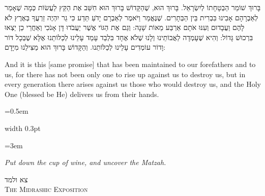 \documentclass[11pt, openany]{book}
\newcommand{\instruction}[1]{%
  \par\vspace{3pt}
  \begin{tcolorbox}[
    enhanced,
    breakable,
    colback=sederlight,
    colframe=sederlight,
    boxrule=0pt,
    left=10pt,
    right=6pt,
    top=4pt,
    bottom=4pt,
    borderline west={2pt}{0pt}{sederwine!60},
    arc=0pt,
    outer arc=0pt,
  ]
    {\small\itshape\textcolor{sederwine}{#1}}
  \end{tcolorbox}
  \par\vspace{2pt}
}
\newlength{\bidiHebWidth}
\newlength{\bidiEngWidth}
\newenvironment{bilingual}{%
  \par\vspace{4pt}%
}{%
  \noindent
  \begin{minipage}[t]{\bidiEngWidth}
    \setstretch{1.4}\emergencystretch=0.5em\normalsize
    \usebox{\bidiEngBox}
  \end{minipage}%
  \hfill
  {\color{sedergold}\vrule width 0.3pt}%
  \hfill
  \begin{minipage}[t]{\bidiHebWidth}
    \begingroup\hebrewfont\TeXXeTstate=1\beginR
    \large\setstretch{1.4}\emergencystretch=3em\tolerance=9999\parindent=0pt\relax
    \usebox{\bidiHebBox}
    \endR\endgroup
  \end{minipage}%
  \par\vspace{2pt}%
}
\newenvironment{hebrewcol}{%
  \begin{lrbox}{\bidiHebBox}\begin{minipage}{\bidiHebWidth}%
}{%
  \end{minipage}\end{lrbox}%
}
\newenvironment{englishcol}{%
  \begin{lrbox}{\bidiEngBox}\begin{minipage}{\bidiEngWidth}%
}{%
  \end{minipage}\end{lrbox}%
}
\newcommand{\subsedertitle}[2]{%
  \par\vspace{8pt}
  \begin{center}
    {\hebrewfontlarge\TeXXeTstate=1\beginR\textcolor{sederblue}{#1}\endR}\\[3pt]
    {\normalsize\scshape\textcolor{sederblue}{#2}}
  \end{center}
  \par\vspace{3pt}
}
\begin{document}
\begin{bilingual}
\begin{hebrewcol}
בָּרוּךְ שׁוֹמֵר הַבְטָחָתוֹ לְיִשְׂרָאֵל. בָּרוּךְ הוּא, שֶׁהַקָּדוֹשׁ בָּרוּךְ הוּא חִשֵּׁב אֶת הַקֵּץ לַעֲשׂוֹת כְּמָה שֶׁאָמַר לְאַבְרָהָם אָבִינוּ בִּבְרִית בֵּין הַבְּתָרִים. שֶׁנֶּאֱמַר וַיֹּאמֶר לְאַבְרָם יָדֹעַ תֵּדַע כִּי גֵר יִהְיֶה זַרְעֲךָ בְּאֶרֶץ לֹא לָהֶם וַעֲבָדוּם וְעִנּוּ אֹתָם אַרְבַּע מֵאוֹת שָׁנָה: וְגַם אֶת הַגּוֹי אֲשֶׁר יַעֲבֹדוּ דָּן אָנֹכִי וְאַחֲרֵי כֵן יֵצְאוּ בִּרְכוּשׁ גָּדוֹל:
וְהִיא שֶׁעָמְדָה לַאֲבוֹתֵינוּ וְלָנוּ שֶׁלֹא אֶחָד בִּלְבַד עָמַד עָלֵינוּ לְכַלּוֹתֵנוּ אֶלָּא שֶׁבְּכָל דּוֹר וָדוֹר עוֹמְדִים עָלֵינוּ לְכַלּוֹתֵנוּ. וְהַקָּדוֹשׁ בָּרוּךְ הוּא מַצִּילֵנוּ מִיָּדָם:
\end{hebrewcol}
\begin{englishcol}
And it is this [same promise] that has been maintained to our forefathers and to us, for there has not been only one to rise up against us to destroy us, but in every generation there arises against us those who would destroy us, and the Holy One (blessed be He) delivers us from their hands.
\end{englishcol}
\end{bilingual}
\instruction{Put down the cup of wine, and uncover the Matzah.}

\subsedertitle{צא ולמד}{The Midrashic Exposition}
\end{document}
